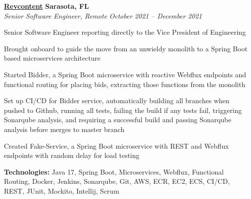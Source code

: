 %
    \headerrow
        {\textbf{\href{https://www.revcontent.com/}{Revcontent}}}
        {\textbf{Sarasota, FL}}
    \\
    \headerrow
        {\emph{Senior Software Engineer, Remote}}
        {\emph{October 2021 -- December 2021}}
    \begin{itemize*}
        \item Senior Software Engineer reporting directly to the Vice President of Engineering
        \item Brought onboard to guide the move from an unwieldy monolith to a Spring Boot based
            microservices architecture
        \item Started Bidder, a Spring Boot microservice with reactive Webflux endpoints and functional
            routing for placing bids, extracting those functions from the monolith
        \item Set up CI/CD for Bidder service, automatically building all branches when pushed to Github,
            running all tests, failing the build if any tests fail, triggering Sonarqube analysis, and requiring
            a successful build and passing Sonarqube analysis before merges to master branch
        \item Created Fake-Service, a Spring Boot microservice with REST and Webflux endpoints with random
            delay for load testing
    \end{itemize*}

    \hspace{1.0em}
        {\textbf{Technologies:} Java 17, Spring Boot, Microservices, Webflux, Functional Routing,
        Docker, Jenkins, Sonarqube, Git, AWS, ECR, EC2, ECS, CI/CD, REST, JUnit, Mockito, Intellij, Scrum}

